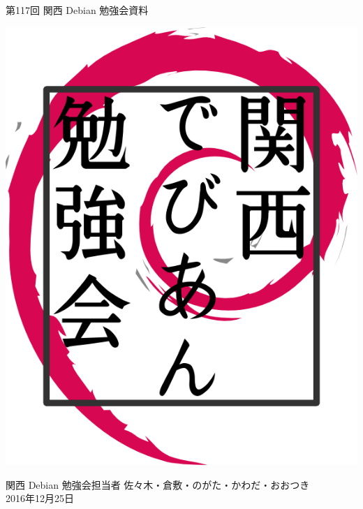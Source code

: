 \documentclass[mingoth,a4paper]{jsarticle}
\newcommand{\debmtgyear}{2016}
\newcommand{\debmtgdate}{25}
\newcommand{\debmtgmonth}{12}
\newcommand{\debmtgnumber}{117}
\begin{document}
\begin{titlepage}


 第\debmtgnumber{}回 関西 Debian 勉強会資料

\vspace{2cm}

\begin{center}
\includegraphics{image200802/kansaidebianlogo.png}
\end{center}

\begin{flushright}
\hfill{}関西 Debian 勉強会担当者 佐々木・倉敷・のがた・かわだ・おおつき \\
\hfill{}\debmtgyear{}年\debmtgmonth{}月\debmtgdate{}日
\end{flushright}

\thispagestyle{empty}
\end{titlepage}


\vspace{1em}
\end{document}
